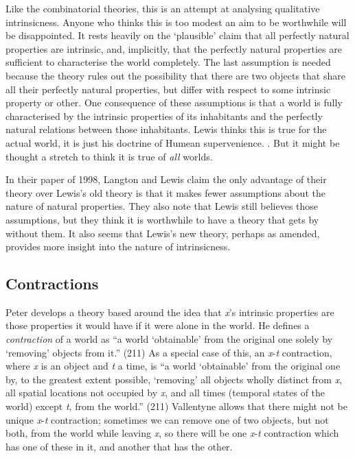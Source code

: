 \noindent Like the combinatorial theories, this is an attempt at analysing qualitative intrinsicness. Anyone who thinks this is too modest an aim to be worthwhile will be disappointed. It rests heavily on the `plausible' claim that all perfectly natural properties are intrinsic, and, implicitly, that the perfectly natural properties are sufficient to characterise the world completely. The last assumption is needed because the theory rules out the possibility that there are two objects that share all their perfectly natural properties, but differ with respect to some intrinsic property or other. One consequence of these assumptions is that a world is fully characterised by the intrinsic properties of its inhabitants and the perfectly natural relations between those inhabitants. Lewis thinks this is true for the actual world, it is just his doctrine of Humean supervenience. \citep[i-xiii]{Lewis1986b}. But it might be thought a stretch to think it is true of \textit{all} worlds.

In their paper of 1998, Langton and Lewis claim the only advantage of their theory over Lewis's old theory is that it makes fewer assumptions about the nature of natural properties. They also note that Lewis still believes those assumptions, but they think it is worthwhile to have a theory that gets by without them. It also seems that Lewis's new theory, perhaps as amended, provides more insight into the nature of intrinsicness.

\subsection{Contractions}
Peter \citet{Vallentyne1997} develops a theory based around the idea that \textit{x}'s intrinsic properties are those properties it would have if it were alone in the world. He defines a \textit{contraction} of a world as ``a world `obtainable' from the original one solely by `removing' objects from it.'' (211) As a special case of this, an \textit{x}{}-\textit{t} contraction, where \textit{x} is an object and \textit{t} a time, is ``a world `obtainable' from the original one by, to the greatest extent possible, `removing' all objects wholly distinct from \textit{x}, all spatial locations not occupied by \textit{x}, and all times (temporal states of the world) except \textit{t}, from the world.'' (211) Vallentyne allows that there might not be unique \textit{x}{}-\textit{t} contraction; sometimes we can remove one of two objects, but not both, from the world while leaving \textit{x}, so there will be one \textit{x}{}-\textit{t} contraction which has one of these in it, and another that has the other.

